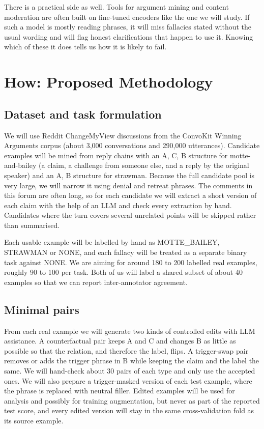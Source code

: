 \documentclass[11pt,a4paper]{article}
\begin{document}
There is a practical side as well. Tools for argument mining and content moderation are often built on fine-tuned encoders like the one we will study. If such a model is mostly reading phrases, it will miss fallacies stated without the usual wording and will flag honest clarifications that happen to use it. Knowing which of these it does tells us how it is likely to fail.

\section{How: Proposed Methodology}

\subsection{Dataset and task formulation}

We will use Reddit ChangeMyView discussions from the ConvoKit Winning Arguments corpus (about 3,000 conversations and 290,000 utterances). Candidate examples will be mined from reply chains with an A, C, B structure for motte-and-bailey (a claim, a challenge from someone else, and a reply by the original speaker) and an A, B structure for strawman. Because the full candidate pool is very large, we will narrow it using denial and retreat phrases. The comments in this forum are often long, so for each candidate we will extract a short version of each claim with the help of an LLM and check every extraction by hand. Candidates where the turn covers several unrelated points will be skipped rather than summarised.

Each usable example will be labelled by hand as MOTTE\_BAILEY, STRAWMAN or NONE, and each fallacy will be treated as a separate binary task against NONE. We are aiming for around 180 to 200 labelled real examples, roughly 90 to 100 per task. Both of us will label a shared subset of about 40 examples so that we can report inter-annotator agreement.

\subsection{Minimal pairs}

From each real example we will generate two kinds of controlled edits with LLM assistance. A counterfactual pair keeps A and C and changes B as little as possible so that the relation, and therefore the label, flips. A trigger-swap pair removes or adds the trigger phrase in B while keeping the claim and the label the same. We will hand-check about 30 pairs of each type and only use the accepted ones. We will also prepare a trigger-masked version of each test example, where the phrase is replaced with neutral filler. Edited examples will be used for analysis and possibly for training augmentation, but never as part of the reported test score, and every edited version will stay in the same cross-validation fold as its source example.
\end{document}
